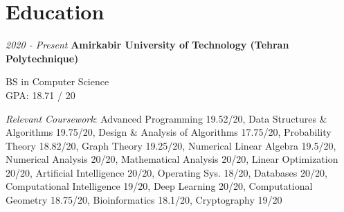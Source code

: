
\section{Education}




\begin{twocolentry}{\textit{2020 - Present}}
	\textbf{Amirkabir University of Technology (Tehran Polytechnique)}
	
	BS in Computer Science
	\\
	GPA: 18.71 / 20
\end{twocolentry}
	\hspace{0.1cm}
	{\footnotesize
	\textit{Relevant Coursework}: 	Advanced Programming 19.52/20, 
	Data Structures \& Algorithms 19.75/20, 
	Design \& Analysis of Algorithms 17.75/20, 
	Probability Theory 18.82/20, 
	Graph Theory 19.25/20, 
	Numerical Linear Algebra 19.5/20, 
	Numerical Analysis 20/20, 
	Mathematical Analysis 20/20, 
	Linear Optimization 20/20, 
	Artificial Intelligence 20/20, 
	Operating Sys. 18/20, Databases 20/20, 
	Computational Intelligence 19/20, 
	Deep Learning 20/20, 
	Computational Geometry 18.75/20, 
	Bioinformatics 18.1/20, 
	Cryptography 19/20}
	

